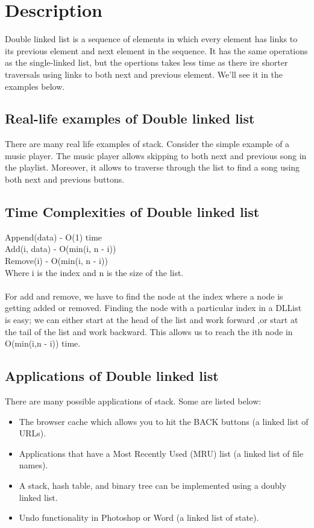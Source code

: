 \documentclass[11pt,fleqn]{book} %
\begin{document}
\section{Description}
Double linked list is a sequence of elements in which every element has links to its previous element and next element in the sequence.
It has the same operations as the single-linked list, but the opertions takes less time as there ire shorter traversals using links to both next and previous element. We'll see it in the examples below.
 
\subsection{Real-life examples of Double linked list}
There are many real life examples of stack. Consider the simple example of a music player. The music player allows skipping to both next and previous song in the playlist. Moreover, it allows to traverse through the list to find a song using both next and previous buttons.

\subsection{Time Complexities of Double linked list}
Append(data) - O(1) time \\
Add(i, data) - O(min(i, n - i))\\
Remove(i) - O(min(i, n - i))\\ 
Where i is the index and n is the size of the list.\\ \\
For add and remove, we have to find the node at the index where a node is getting added or removed. Finding the node with a particular index in a DLList is easy; we can either start at the head of the list and work forward ,or start at the tail of the list and work backward. This allows us to reach the ith node in O(min(i,n - i)) time.
 
\subsection{Applications of Double linked list}
There are many possible applications of stack. Some are listed below:
\begin{itemize}
	\item The browser cache which allows you to hit the BACK buttons (a linked list of URLs).
	\item Applications that have a Most Recently Used (MRU) list (a linked list of file names).
	\item A stack, hash table, and binary tree can be implemented using a doubly linked list. 
	\item Undo functionality in Photoshop or Word (a linked list of state).
\end{itemize}
\end{document}
